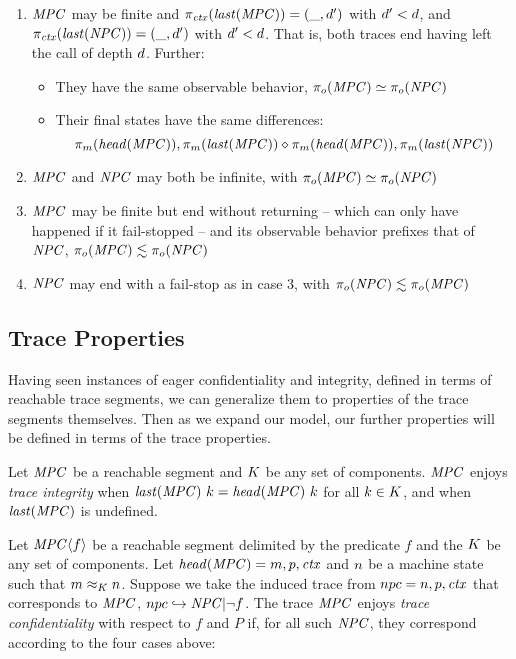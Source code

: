 \documentclass[acmsmall,review,anonymous]{acmart}\settopmatter{printfolios=true,printccs=false,printacmref=false}
\begin{document}
\begin{enumerate}
\item \(\mathit{MPC}\) may be finite and \(\pi_{\mathit{ctx}}(\mathit{last}(\mathit{MPC})) = (\_,d')\) with \(d' < d\),
  and \(\pi_{\mathit{ctx}}(\mathit{last}(\mathit{NPC})) = (\_,d')\) with \(d' < d\). That is, both traces end
  having left the call of depth \(d\). Further:
  \begin{itemize}
  \item They have the same observable behavior, \(\pi_o(\mathit{MPC}) \simeq \pi_o(\mathit{NPC})\)
  \item Their final states have the same differences:
    \[\pi_m(\mathit{head}(\mathit{MPC})), \pi_m(\mathit{last}(\mathit{MPC})) \diamond
    \pi_m(\mathit{head}(\mathit{MPC})), \pi_m(\mathit{last}(\mathit{NPC}))\]
  \end{itemize}
\item \(\mathit{MPC}\) and \(\mathit{NPC}\) may both be infinite, with \(\pi_o(\mathit{MPC}) \simeq \pi_o(\mathit{NPC})\)
\item \(\mathit{MPC}\) may be finite but end without returning -- which can only have happened if it fail-stopped --
  and its observable behavior prefixes that of \(\mathit{NPC}\), \(\pi_o(\mathit{MPC}) \lesssim \pi_o(\mathit{NPC})\)
\item \(\mathit{NPC}\) may end with a fail-stop as in case 3, with \(\pi_o(\mathit{NPC}) \lesssim \pi_o(\mathit{MPC})\)
\end{enumerate}

\subsection{Trace Properties}

Having seen instances of eager confidentiality and integrity, defined in terms of reachable trace
segments, we can generalize them to properties of the trace segments themselves. Then as we expand
our model, our further properties will be defined in terms of the trace properties.

 Let \(\mathit{MPC}\) be a reachable segment and \(K\) be any set of components.
\(\mathit{MPC}\) enjoys {\em trace integrity} when \(\mathit{last}(\mathit{MPC}) ~ k = \mathit{head}(\mathit{MPC}) ~ k\)
for all \(k \in K\), and when \(\mathit{last}(\mathit{MPC})\) is undefined.

 Let \(\mathit{MPC} \langle f \rangle\) be a reachable segment delimited by the predicate \(f\)
and the \(K\) be any set of components. Let \(\mathit{head}(\mathit{MPC}) = m,p,\mathit{ctx}\)
and \(n\) be a machine state such that \(m \approx_K n\). Suppose we take the
induced trace from \(npc = n,p,\mathit{ctx}\) that corresponds to \(\mathit{MPC}\),
\(npc \hookrightarrow \mathit{NPC} | \neg f\). The trace \(\mathit{MPC}\) enjoys {\em trace confidentiality}
with respect to \(f\) and \(P\) if, for all such \(\mathit{NPC}\), they correspond according to the four cases
above:
\end{document}
